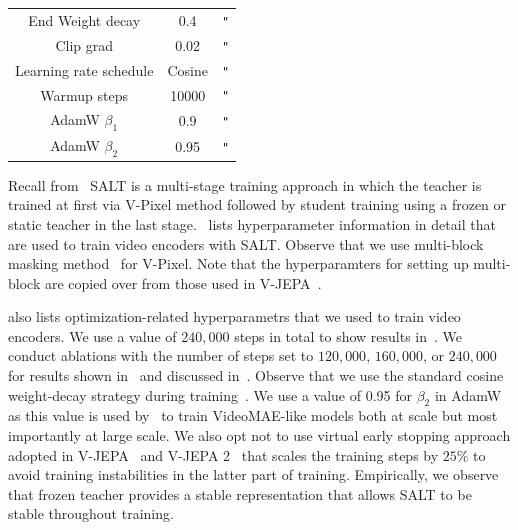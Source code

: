 \documentclass{applemlr}
\numberwithin{equation}{section}
\newcommand{\ourmethod}{SALT\xspace}
\newcommand{\ditto}{\texttt{"}}
\begin{document}
\begin{table}[htbp]
\begin{tabular}{ccc}
        End Weight decay                &  0.4                      & \ditto \\
        Clip grad                      &  0.02                       & \ditto      \\
        Learning rate schedule          & Cosine                    & \ditto \\
        Warmup steps                    &  10000                      & \ditto \\
        AdamW $\beta_{1}$               &  0.9                      & \ditto \\
        AdamW $\beta_{2}$               &  0.95                     & \ditto \\
        \bottomrule
    \end{tabular}
\end{table}

Recall from~ \ourmethod is a multi-stage training approach in which the teacher is trained at first via V-Pixel method followed by student training using a frozen or static teacher in the last stage.~ lists hyperparameter information  in detail that are used to train video encoders with \ourmethod. Observe that we use multi-block masking method~\citep{bardes2024vjepa} for V-Pixel. Note that the hyperparamters for setting up multi-block are copied over from those used in V-JEPA~\citep{bardes2024vjepa}. 

 also lists optimization-related hyperparametrs that we used to train video encoders. We use a value of $240,000$ steps in total to show results in~. We conduct ablations with the number of steps set to $120,000$, $160,000$, or $240,000$ for results shown in~ and discussed in~. Observe that we use the standard cosine weight-decay strategy during training~\citep{bardes2024vjepa}. We use a value of 0.95 for $\beta_{2}$ in AdamW~\citep{loshchilov2017decoupled} as this value is used by~\citet{carreira2024scaling} to train VideoMAE-like models both at scale but most importantly at large scale. We also opt not to use virtual early stopping approach adopted in V-JEPA~\citep{bardes2024vjepa} and V-JEPA 2~\citep{assran2025vjepa2} that scales the training steps by $25\%$ to avoid training instabilities in the latter part of training. Empirically, we observe that frozen teacher provides a stable representation that allows \ourmethod to be stable throughout training.
\end{document}
